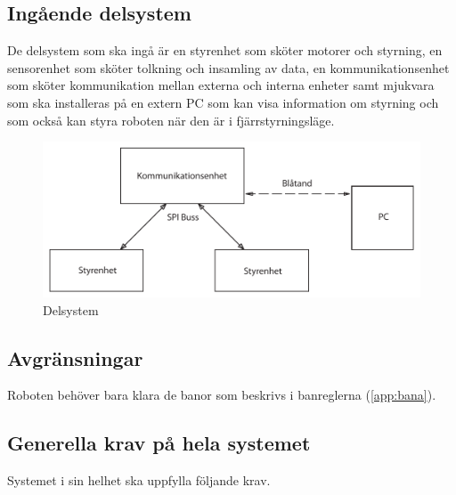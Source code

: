 \documentclass[a4paper,12pt]{article}
\begin{document}
\subsection{Ingående delsystem}
De delsystem som ska ingå är en styrenhet som sköter motorer och styrning,
en sensorenhet som sköter tolkning och insamling av data,
en kommunikationsenhet som sköter kommunikation mellan externa och interna enheter samt mjukvara 
som ska installeras på en extern PC som kan visa information om 
styrning och som också kan styra roboten när den är i fjärrstyrningsläge.

\begin{figure}[h!]
	\caption{Delsystem}
	\begin{center}
		\includegraphics[scale=0.8,angle=0]{delsystem2.pdf}
	\end{center}
\end{figure}

\subsection{Avgränsningar}
Roboten behöver bara klara de banor som beskrivs i banreglerna (\ref{app:bana}).

\subsection{Generella krav på hela systemet}
Systemet i sin helhet ska uppfylla följande krav.

\begin{LIPSkravlista}
\end{LIPSkravlista}
\end{document}
